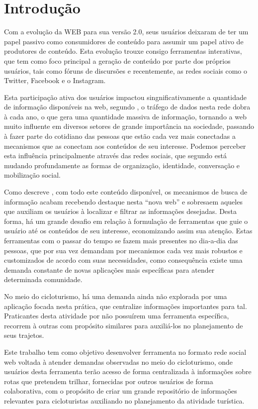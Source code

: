\section{\esp Introdução}
Com a evolução da WEB para sua versão 2.0, seus usuários deixaram de ter um papel passivo como consumidores de conteúdo para assumir
um papel ativo de produtores de conteúdo. Esta evolução trouxe consigo ferramentas interativas, que tem como foco principal a geração de 
conteúdo por parte dos próprios usuários, tais como fóruns de discursões e recentemente, as redes sociais como o Twitter, Facebook 
e o Instagram.

Esta participação ativa dos usuários impactou singnificativamente a quantidade de informação disponíveis na web, segundo \cite{artigo01}, 
o tráfego de dados nesta rede dobra à cada ano, o que gera uma quantidade massiva de informação, tornando a web muito influente em diversos setores 
de grande importância na sociedade, passando à fazer parte do cotidiano das pessoas que estão cada vez mais conectadas a mecanismos que as 
conectam aos conteúdos de seu interesse. Podemos perceber esta influência principalmente através das redes sociais, que segundo 
\cite{redesSociais01} está mudando profundamente as formas de organização, identidade, conversação e mobilização social.

Como descreve \cite{deitelAjax}, com todo este conteúdo disponível, os mecanismos de busca de informação 
acabam recebendo destaque nesta ``nova web'' e sobresaem aqueles que auxiliam os usuários  à localizar e filtrar 
as informações desejadas. Desta forma, há um grande desafio em relação à formulação de ferramentas que guie o usuário até os conteúdos de seu 
interesse, economizando assim sua atenção. Estas ferramentas com o passar do tempo se fazem mais presentes no dia-a-dia das pessoas, 
que por sua vez demandam por mecanismos cada vez mais robustos e customizados de acordo com suas necessidades, como consequência existe 
uma demanda constante de novas aplicações mais específicas para atender determinada comunidade.

No meio do cicloturismo, há uma demanda ainda não explorada por uma aplicação focada nesta prática, que centralize informações 
importantes para tal. Praticantes desta atividade por não possuírem uma ferramenta específica, recorrem à outras com propósito similares 
para auxiliá-los no planejamento de seus trajetos.

Este trabalho tem como objetivo desenvolver ferramenta no formato rede social web voltada à atender demandas observadas no meio do cicloturismo,
onde usuários desta ferramenta terão acesso de forma centralizada à informações sobre rotas que pretendem trilhar, fornecidas por outros usuários
de forma colaborativa, com o propósito de criar um grande repositório de informações relevantes para cicloturistas auxiliando no planejamento da 
atividade turística.